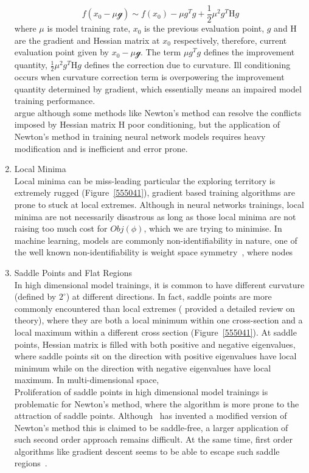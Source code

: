 \begin{enumerate}
\begin{equation}
    f(x_0-\mu\mathcal{g}) \sim f(x_0) - \mu g^Tg + \frac{1}{2}\mu^2g^T\mathrm{H}g
\end{equation}
where $\mu$ is model training rate, $x_0$ is the previous evaluation point, $g$ and $\mathrm{H}$ are the gradient and Hessian matrix at $x_0$ respectively, therefore, current evaluation point given by $x_0-\mu\mathcal{g}$. The term $\mu g^Tg$ defines the improvement quantity, $\frac{1}{2}\mu^2g^T\mathrm{H}g$ defines the correction due to curvature. Ill conditioning occurs when curvature correction term is overpowering the improvement quantity determined by gradient, which essentially means an impaired model training performance. \\
\citet{Goodfellow-et-al-2016} argue although some methods like Newton's method can resolve the conflicts imposed by Hessian matrix $\mathrm{H}$ poor conditioning, but the application of Newton's method in training neural network models requires heavy modification and is inefficient and error prone. 
    \item Local Minima \\
Local minima can be miss-leading particular the exploring territory is extremely rugged (Figure~\ref{555041}), gradient based training algorithms are prone to stuck at local extremes. Although in neural networks trainings, local minima are not necessarily disastrous as long as those local minima are not raising too much cost for $Obj(\phi)$, which we are trying to minimise. In machine learning, models are commonly non-identifiability in nature, one of the well known non-identifiability is weight space symmetry~\cite{BadrinarayananM15}, where nodes 
    \item Saddle Points and Flat Regions\\
In high dimensional model trainings, it is common to have different curvature (defined by $2^\circ$) at different directions. In fact, saddle points are more commonly encountered than local extremes (\citet{DauphinPGCGB14} provided a detailed review on theory), where they are both a local minimum within one cross-section and a local maximum within a different cross section (Figure~\ref{555041}). At saddle points, Hessian matrix is filled with both positive and negative eigenvalues, where saddle points sit on the direction with positive eigenvalues have local minimum while on the direction with negative eigenvalues have local maximum. In multi-dimensional space,  \\
Proliferation of saddle points in high dimensional model trainings is problematic for Newton's method, where the algorithm is more prone to the attraction of saddle points. Although~\citet{DauphinPGCGB14} has invented a modified version of Newton's method this is claimed to be saddle-free, a larger application of such second order approach remains difficult. At the same time, first order algorithms like gradient descent seems to be able to escape such saddle regions~\cite{GoodfellowV14}.\\

\end{enumerate}
